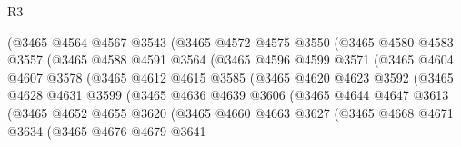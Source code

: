 \begin{lexlean}{R3}
\begin{coremodule}
                      (@3465
                        @4564
                        @4567
                        @3543
                        (@3465
                          @4572
                          @4575
                          @3550
                          (@3465
                            @4580
                            @4583
                            @3557
                            (@3465
                              @4588
                              @4591
                              @3564
                              (@3465
                                @4596
                                @4599
                                @3571
                                (@3465
                                  @4604
                                  @4607
                                  @3578
                                  (@3465
                                    @4612
                                    @4615
                                    @3585
                                    (@3465
                                      @4620
                                      @4623
                                      @3592
                                      (@3465
                                        @4628
                                        @4631
                                        @3599
                                        (@3465
                                          @4636
                                          @4639
                                          @3606
                                          (@3465
                                            @4644
                                            @4647
                                            @3613
                                            (@3465
                                              @4652
                                              @4655
                                              @3620
                                              (@3465
                                                @4660
                                                @4663
                                                @3627
                                                (@3465
                                                  @4668
                                                  @4671
                                                  @3634
                                                  (@3465
                                                    @4676
                                                    @4679
                                                    @3641

\end{coremodule}
\end{lexlean}
